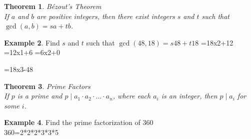 \documentclass[letterpaper,10pt]{article}
\theoremstyle{plain}
\newtheorem{thm}{Theorem}[section]
\theoremstyle{definition}
\newtheorem{exmp}[thm]{Example}
\theoremstyle{remark}
\begin{document}
\begin{thm}{Bézout's Theorem}$ $\\
If $a$ and $b$ are positive integers, then there exist integers $s$ and $t$ such that $\gcd(a, b) = sa + tb$.
\end{thm}
\begin{exmp}
Find $s$ and $t$ such that $\gcd(48,18)= s48 + t18$
\vspace{2cm}
=18x2+12
=12x1+6
=6x2+0
\newline

=18x3-48
\end{exmp}

\begin{thm}{Prime Factors}$ $\\
If $p$ is a prime and $p \mid a_1 \cdot a_2 \cdot \ldots \cdot a_n$, where each $a_i$ is an integer, then $p \mid a_i$ for some $i$.
\end{thm}
\begin{exmp}{Find the prime factorization of 360}
\vspace{2cm} $ $\\
360=2*2*2*3*3*5
\end{exmp}
\end{document}
